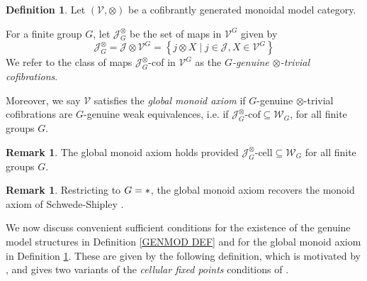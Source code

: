 \documentclass[a4paper,10pt
,draft
]{article}%
\numberwithin{equation}{section}
\numberwithin{figure}{section}
\theoremstyle{definition} %
\newtheorem{definition}[equation]{Definition}%
\newtheorem{remark}[equation]{Remark}%
\newcommand{\sets}[2]{\left\{ #1 \;|\; #2\right\}}%
\newcommand{\V}{\ensuremath{\mathcal V}}
\newcommand{\1}{\ensuremath{\mathbbm 1}}%
\begin{document}
\begin{definition}\label{GLOBMONAX_DEF}
	Let $(\V,\otimes)$ 
	be a cofibrantly generated monoidal model category.
		
	For a finite group $G$, let $\mathcal{J}^{\otimes}_G$ be the set of
	maps in $\V^G$ given by 
\[
\mathcal{J}^{\otimes}_G
=
\mathcal J \otimes \V^G
=
\sets{j \otimes X}{j \in \mathcal{J},X \in \V^G}
\]
We refer to the class of maps  
$\mathcal{J}^{\otimes}_G$-cof in $\V^G$
as the \emph{$G$-genuine $\otimes$-trivial cofibrations}.

Moreover, we say $\V$ satisfies the \textit{global monoid axiom} if
$G$-genuine $\otimes$-trivial cofibrations are $G$-genuine weak equivalences,
i.e. if $\mathcal J^{\otimes}_G \text{-cof} \subseteq \mathcal W_G$,
for all finite groups $G$.
\end{definition}



\begin{remark}
	The global monoid axiom holds provided
	$\mathcal J^{\otimes}_G \text{-cell} \subseteq \mathcal W_G$
	for all finite groups $G$.
\end{remark}


\begin{remark}\label{MONAX_REM}
	Restricting to $G = \**$, the global monoid axiom  
	recovers the monoid axiom of Schwede-Shipley \cite{SS00}.
\end{remark}



We now discuss convenient sufficient conditions 
for the existence of the genuine model structures in 
Definition \ref{GENMOD DEF}
and for the global monoid axiom in 
Definition \ref{GLOBMONAX_DEF}.
These are given by the following definition,
which is motivated by \cite[Remark 2.7]{Ste16},
and gives two variants of the 
\emph{cellular fixed points} conditions of
\cite[Prop. 2.6]{Ste16}.
\end{document}
